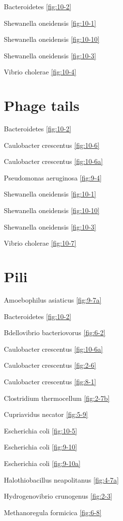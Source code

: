 \documentclass[]{tufte-book}
\begin{document}
Bacteroidetes \ref{fig:10-2}

Shewanella oneidensis \ref{fig:10-1}

Shewanella oneidensis \ref{fig:10-10}

Shewanella oneidensis \ref{fig:10-3}

Vibrio cholerae \ref{fig:10-4}

\section*{Phage tails}\label{phage-tails}

Bacteroidetes \ref{fig:10-2}

Caulobacter crescentus \ref{fig:10-6}

Caulobacter crescentus \ref{fig:10-6a}

Pseudomonas aeruginosa \ref{fig:9-4}

Shewanella oneidensis \ref{fig:10-1}

Shewanella oneidensis \ref{fig:10-10}

Shewanella oneidensis \ref{fig:10-3}

Vibrio cholerae \ref{fig:10-7}

\section*{Pili}\label{pili}

Amoebophilus asiaticus \ref{fig:9-7a}

Bacteroidetes \ref{fig:10-2}

Bdellovibrio bacteriovorus \ref{fig:6-2}

Caulobacter crescentus \ref{fig:10-6a}

Caulobacter crescentus \ref{fig:2-6}

Caulobacter crescentus \ref{fig:8-1}

Clostridium thermocellum \ref{fig:2-7b}

Cupriavidus necator \ref{fig:5-9}

Escherichia coli \ref{fig:10-5}

Escherichia coli \ref{fig:9-10}

Escherichia coli \ref{fig:9-10a}

Halothiobacillus neapolitanus \ref{fig:4-7a}

Hydrogenovibrio crunogenus \ref{fig:2-3}

Methanoregula formicica \ref{fig:6-8}
\end{document}
